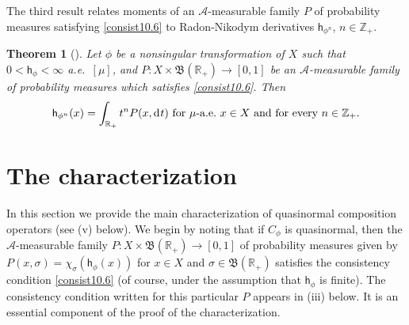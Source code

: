 \documentclass[draft,reqno]{amsproc}
\numberwithin{equation}{section}
\newtheorem{thm}{Theorem}[section]
\theoremstyle{remark}
\theoremstyle{definition}
\begin{document}
The third result relates moments of an
${\mathscr A}$-measurable family $P$ of probability measures
satisfying \eqref{consist10.6} to Radon-Nikodym
derivatives ${\mathsf h}_{\phi^n}$, $n\in {\mathbb Z}_+$.
   \begin{thm}[\mbox{\cite[Theorem 5.4]{b-j-j-sD}}] \label{sms}
Let $\phi$ be a nonsingular transformation of $X$ such
that $0 < {\mathsf h}_{\phi} < \infty$ a.e.\ $[\mu]$, and
$P\colon X \times {{\mathfrak B}({{\mathbb R}_+})} \to [0,1]$ be an
${\mathscr A}$-measurable family of probability measures
which satisfies \eqref{consist10.6}. Then
   \begin{align*}
{\mathsf h}_{\phi^n}(x)=\int_{{\mathbb R}_+} t^n P(x,\operatorname{d\hspace{-0.25ex}} t) \text{
for $\mu$-a.e.\ $x \in X$ and for every $n \in
{\mathbb Z}_+$.}
   \end{align*}
   \end{thm}
   \section{The characterization}
In this section we provide the main characterization
of quasinormal composition operators (see (v) below).
We begin by noting that if $C_{\phi}$ is quasinormal,
then the ${\mathscr A}$-measurable family $P\colon X \times
{{\mathfrak B}({{\mathbb R}_+})} \to [0,1]$ of probability measures
given by $P(x,\sigma) = \chi_{\sigma}({\mathsf h}_{\phi}(x))$
for $x\in X$ and $\sigma \in {{\mathfrak B}({{\mathbb R}_+})}$ satisfies
the consistency condition \eqref{consist10.6} (of
course, under the assumption that ${\mathsf h}_{\phi}$ is
finite). The consistency condition written for this
particular $P$ appears in (iii) below. It is an
essential component of the proof of the
characterization.
\end{document}
